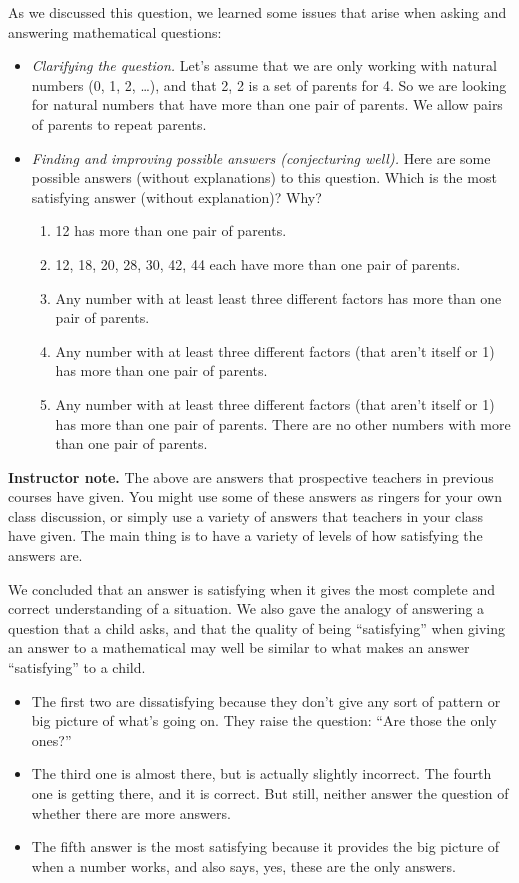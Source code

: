 \documentclass[11pt]{article}
\newcommand\smallnote[1]
	{\begin{mdframed}\raggedright  {\bf Instructor note.} {#1} \end{mdframed}}
\theoremstyle{definition}
\begin{document}
As we discussed this question, we learned some issues that arise when asking and answering mathematical questions:

\begin{itemize}
\item {\it Clarifying the question.}  Let's assume that we are only working with natural numbers (0, 1, 2, \dots), and that 2, 2 is a set of parents for 4. So we are looking for natural numbers that have more than one pair of parents. We allow pairs of parents to repeat parents.
\item {\it Finding and improving possible answers (conjecturing well).} Here are some possible answers (without explanations) to this question. Which is the most satisfying answer (without explanation)? Why?
	\begin{enumerate}
	\item 12 has more than one pair of parents.
	\item 12, 18, 20, 28, 30, 42, 44 each have more than one pair of parents.
	\item Any number with at least least three different factors has more than one pair of parents.
	\item Any number with at least three different factors (that aren't itself or 1) has more than one pair of parents.
	\item Any number with at least three different factors (that aren't itself or 1) has more than one pair of parents. There are no other numbers with more than one pair of parents.
	\end{enumerate}
\end{itemize}

\smallnote{The above are answers that prospective teachers in previous courses have given. You might use some of these answers as ringers for your own class discussion, or simply use a variety of answers that teachers in your class have given. The main thing is to have a variety of levels of how satisfying the answers are.}

We concluded that an answer is satisfying when it gives the most complete and correct understanding of a situation. We also gave the analogy of answering a question that a child asks, and that the quality of being ``satisfying'' when giving an answer to a mathematical may well be similar to what makes an answer ``satisfying'' to a child. 

\begin{itemize}
\item The first two are dissatisfying because they don't give any sort of pattern or big picture of what's going on. They
raise the question: ``Are those the only ones?'' 
\item The third one is almost there, but is actually slightly incorrect. The fourth one is getting there, and it is correct. But still, neither answer the question of whether there are more answers.
\item The fifth answer is the most satisfying because it provides the big picture of when a number works, and also says, yes, these are the only answers.
\end{itemize}
\end{document}
